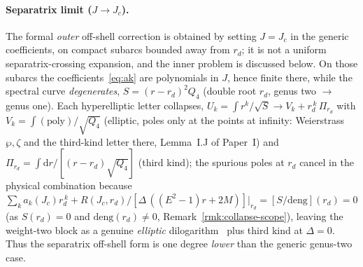 \documentclass[12pt]{iopart}
\theoremstyle{plain}
\theoremstyle{definition}
\theoremstyle{remark}
\newcommand{\Jc}{J_{c}}
\newcommand{\dd}{\mathrm{d}}
\begin{document}
\paragraph{Separatrix limit ($J\to\Jc$).} The formal \emph{outer} off-shell correction
is obtained by setting $J=\Jc$ in the generic coefficients, on compact subarcs bounded
away from $r_d$; it is not a uniform separatrix-crossing expansion, and the
inner problem is discussed below. On those subarcs
the coefficients~\eqref{eq:ak} are polynomials in $J$, hence
finite there, while the spectral curve \emph{degenerates}, $S=(r-r_d)^2Q_4$ (double root
$r_d$, genus two $\to$ genus one). Each hyperelliptic letter collapses,
$U_k=\int r^k/\sqrt S\to V_k+r_d^{\,k}\,\Pi_{r_d}$ with $V_k=\int(\text{poly})/\sqrt{Q_4}$
(elliptic, poles only at the points at infinity: Weierstrass $\wp,\zeta$ and the
third-kind letter there, Lemma~I.J of Paper~I) and $\Pi_{r_d}=\int\dd r/[(r-r_d)\sqrt{Q_4}]$
(third kind); the spurious poles at $r_d$ cancel in the physical combination because
$\sum_k a_k(\Jc)r_d^{\,k}+R(\Jc,r_d)/[\Delta\,((E^2-1)r+2M)]|_{r_d}=[S/\text{deng}](r_d)=0$
(as $S(r_d)=0$ and $\mathrm{deng}(r_d)\neq0$, Remark~\ref{rmk:collapse-scope}), leaving the weight-two block as a genuine \emph{elliptic}
dilogarithm~\cite{BeilinsonLevin1994,BrownLevin2011} plus third kind at $\Delta=0$. Thus
the separatrix off-shell form is one degree \emph{lower} than the generic genus-two case.
\end{document}
